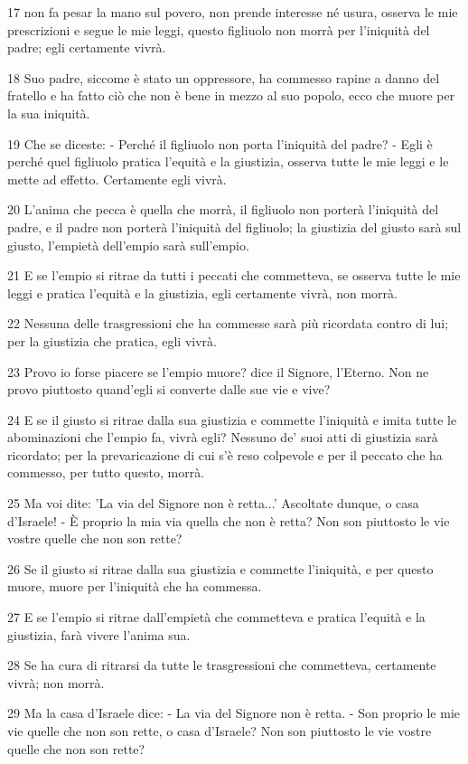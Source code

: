 \par 17 non fa pesar la mano sul povero, non prende interesse né usura, osserva le mie prescrizioni e segue le mie leggi, questo figliuolo non morrà per l'iniquità del padre; egli certamente vivrà.
\par 18 Suo padre, siccome è stato un oppressore, ha commesso rapine a danno del fratello e ha fatto ciò che non è bene in mezzo al suo popolo, ecco che muore per la sua iniquità.
\par 19 Che se diceste: - Perché il figliuolo non porta l'iniquità del padre? - Egli è perché quel figliuolo pratica l'equità e la giustizia, osserva tutte le mie leggi e le mette ad effetto. Certamente egli vivrà.
\par 20 L'anima che pecca è quella che morrà, il figliuolo non porterà l'iniquità del padre, e il padre non porterà l'iniquità del figliuolo; la giustizia del giusto sarà sul giusto, l'empietà dell'empio sarà sull'empio.
\par 21 E se l'empio si ritrae da tutti i peccati che commetteva, se osserva tutte le mie leggi e pratica l'equità e la giustizia, egli certamente vivrà, non morrà.
\par 22 Nessuna delle trasgressioni che ha commesse sarà più ricordata contro di lui; per la giustizia che pratica, egli vivrà.
\par 23 Provo io forse piacere se l'empio muore? dice il Signore, l'Eterno. Non ne provo piuttosto quand'egli si converte dalle sue vie e vive?
\par 24 E se il giusto si ritrae dalla sua giustizia e commette l'iniquità e imita tutte le abominazioni che l'empio fa, vivrà egli? Nessuno de' suoi atti di giustizia sarà ricordato; per la prevaricazione di cui s'è reso colpevole e per il peccato che ha commesso, per tutto questo, morrà.
\par 25 Ma voi dite: 'La via del Signore non è retta...' Ascoltate dunque, o casa d'Israele! - È proprio la mia via quella che non è retta? Non son piuttosto le vie vostre quelle che non son rette?
\par 26 Se il giusto si ritrae dalla sua giustizia e commette l'iniquità, e per questo muore, muore per l'iniquità che ha commessa.
\par 27 E se l'empio si ritrae dall'empietà che commetteva e pratica l'equità e la giustizia, farà vivere l'anima sua.
\par 28 Se ha cura di ritrarsi da tutte le trasgressioni che commetteva, certamente vivrà; non morrà.
\par 29 Ma la casa d'Israele dice: - La via del Signore non è retta. - Son proprio le mie vie quelle che non son rette, o casa d'Israele? Non son piuttosto le vie vostre quelle che non son rette?
